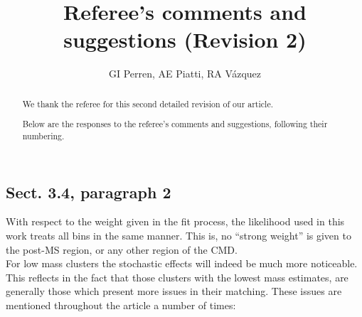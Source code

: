 \documentclass{article}
\begin{document}
\title{Referee's comments and suggestions (Revision 2)}
\author{GI Perren, AE Piatti, RA V\'azquez}

\maketitle

\begin{abstract}
We thank the referee for this second detailed revision of our article.

Below are the responses to the referee's comments and suggestions, following
their numbering.
\end{abstract}

\clearpage
\renewcommand\thesubsection{\arabic{subsection}}

\setcounter{subsection}{8}
\subsection{Sect. 3.4, paragraph 2}
With respect to the weight given in the fit process, the likelihood used in this
work treats all bins in the same manner. This is, no ``strong weight'' is given
to the post-MS region, or any other region of the CMD.\\

\noindent For low mass clusters the stochastic effects will indeed be much more
noticeable. This reflects in the fact that those clusters with the lowest mass
estimates, are generally those which present more issues in their matching.
These issues are mentioned throughout the article a number of times:\\
\end{document}
